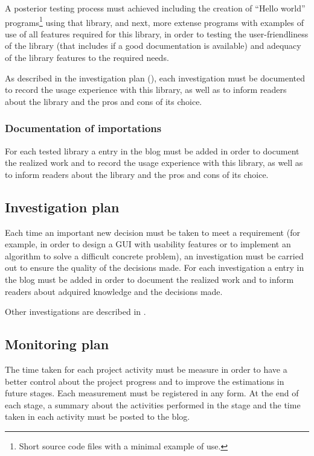 \documentclass[twocolumn, 9pt]{extarticle}
\begin{document}
A posterior testing process must achieved including the creation of
``Hello world'' programs\footnote{Short source code files with a minimal
  example of use.} using that library, and next, more extense programs
with examples of use of all features required for this library, in
order to testing the user-friendliness of the library (that includes if a
good documentation is available) and adequacy of the library features
to the required needs.

As described in the investigation plan
(), each investigation must be
documented to record the usage experience with this library, as well
as to inform readers about the library and the pros and cons of its
choice.

\subsubsection{Documentation of importations}
\label{sssec:documentation-importations}
For each tested library a entry in the \fav blog must be added in
order to document the realized work and to record the usage
experience with this library, as well as to inform readers about the
library and the pros and cons of its choice.

\subsection{Investigation plan}
\label{ssec:investigation-plan}
Each time an important new decision must be taken to meet a
requirement (for example, in order to design a GUI with usability
features or to implement an algorithm to solve a difficult concrete
problem), an investigation must be carried out to ensure the quality
of the decisions made. For each investigation a entry in the \fav blog
must be added in order to document the realized work and to inform
readers about adquired knowledge and the decisions made.

Other investigations are described in
.

\subsection{Monitoring plan}
\label{ssec:monitoring-plan}
The time taken for each project activity must be measure in order to
have a better control about the project progress and to improve the
estimations in future stages. Each measurement must be registered in
any form. At the end of each stage, a summary about the activities
performed in the stage and the time taken in each activity must be
posted to the \favp blog.
\end{document}
